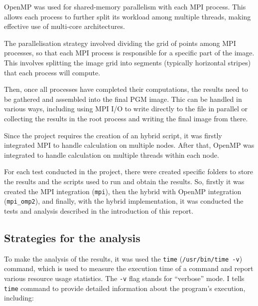 \documentclass[
]{article}
\begin{document}
OpenMP was used for shared-memory parallelism with each MPI process.
This allows each process to further split its workload among multiple
threads, making effective use of multi-core architectures.

The parallelisation strategy involved dividing the grid of points among
MPI processes, so that each MPI process is responsible for a specific
part of the image. This involves splitting the image grid into segments
(typically horizontal stripes) that each process will compute.

Then, once all processes have completed their computations, the results
need to be gathered and assembled into the final PGM image. Thic can be
handled in various ways, including using MPI I/O to write directly to
the file in parallel or collecting the results in the root process and
writing the final image from there.

Since the project requires the creation of an hybrid script, it was
firstly integrated MPI to handle calculation on multiple nodes. After
that, OpenMP was integrated to handle calculation on multiple threads
within each node.

For each test conducted in the project, there were created specific
folders to store the results and the scripts used to run and obtain the
results. So, firstly it was created the MPI integration (\texttt{mpi}),
then the hybrid with OpenMP integration (\texttt{mpi\_omp2}), and
finally, with the hybrid implementation, it was conducted the tests and
analysis described in the introduction of this report.

\subsection{Strategies for the
analysis}\label{strategies-for-the-analysis}

To make the analysis of the results, it was used the \texttt{time}
(\texttt{/usr/bin/time\ -v}) command, which is used to measure the
execution time of a command and report various resource usage
statistics. The \texttt{-v} flag stands for ``verbose'' mode. I tells
\texttt{time} command to provide detailed information about the
program's execution, including:
\end{document}
